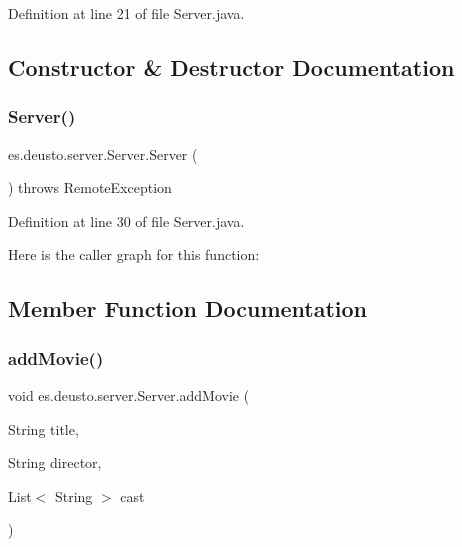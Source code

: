 Definition at line 21 of file Server.\+java.



\subsection{Constructor \& Destructor Documentation}
\mbox{\label{classes_1_1deusto_1_1server_1_1_server_a84f78162a65dd737f224eb2f94c43023}} 
\subsubsection{\texorpdfstring{Server()}{Server()}}
{\footnotesize\ttfamily es.\+deusto.\+server.\+Server.\+Server (\begin{DoxyParamCaption}{ }\end{DoxyParamCaption}) throws Remote\+Exception}



Definition at line 30 of file Server.\+java.

Here is the caller graph for this function\+:


\subsection{Member Function Documentation}
\mbox{\label{classes_1_1deusto_1_1server_1_1_server_a150317903dc393d29f39db81e79131e0}} 
\subsubsection{\texorpdfstring{addMovie()}{addMovie()}}
{\footnotesize\ttfamily void es.\+deusto.\+server.\+Server.\+add\+Movie (\begin{DoxyParamCaption}\item[{String}]{title,  }\item[{String}]{director,  }\item[{List$<$ String $>$}]{cast }\end{DoxyParamCaption})}



